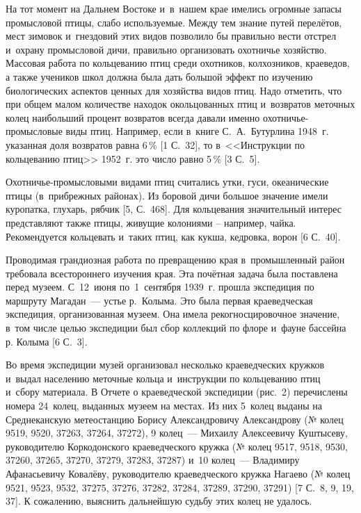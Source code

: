 На тот момент на Дальнем Востоке и~в~нашем крае имелись огромные запасы промысловой птицы, слабо используемые. Между тем знание путей перелётов, мест зимовок и~гнездовий этих видов позволило бы правильно вести отстрел и~охрану промысловой дичи, правильно организовать охотничье хозяйство. Массовая работа по кольцеванию птиц среди охотников, колхозников, краеведов, а также учеников школ должна была дать большой эффект по изучению биологических аспектов ценных для хозяйства видов птиц. Надо отметить, что при общем малом количестве находок окольцованных птиц и~возвратов меточных колец наибольший процент возвратов всегда давали именно охотничье-промысловые виды птиц. Например, если в~книге С.~А.~Бутурлина 1948~г. указанная доля возвратов равна 6\,\% [1 С.~32], то в~<<Инструкции по кольцеванию птиц>> 1952~г. это число равно 5\,\% [3 С.~5].

Охотничье-промысловыми видами птиц считались утки, гуси, океанические птицы (в~прибрежных районах). Из боровой дичи большое значение имели куропатка, глухарь, рябчик [5, С.~468]. Для кольцевания значительный интерес представляют также птицы, живущие колониями – например, чайка. Рекомендуется кольцевать и~таких птиц, как кукша, кедровка, ворон [6 С.~40].

Проводимая грандиозная работа по превращению края в~промышленный район требовала всестороннего изучения края. Эта почётная задача была поставлена перед музеем. С~12~июня по~1~сентября 1939~г. прошла экспедиция по маршруту Магадан~--- устье р.~Колыма. Это была первая краеведческая экспедиция, организованная музеем. Она имела рекогносцировочное значение, в~том числе целью экспедиции был сбор коллекций по флоре и~фауне бассейна р. Колыма [6 С.~3].

Во время экспедиции музей организовал несколько краеведческих кружков и~выдал населению меточные кольца и~инструкции по кольцеванию птиц и~сбору материала. В Отчете о краеведческой экспедиции (рис.~2) перечислены номера 24~колец, выданных музеем на местах. Из них 5~колец выданы на Среднеканскую метеостанцию Борису Александровичу Александрову (№ колец 9519, 9520, 37263, 37264, 37272), 9 колец~--- Михаилу Алексеевичу Куштысеву, руководителю Коркодонского краеведческого кружка (№ колец 9517, 9518, 9530, 37260, 37265, 37270, 37279, 37283, 37287) и~10 колец~--- Владимиру Афанасьевичу Ковалёву, руководителю краеведческого кружка Нагаево (№ колец 9521, 9523, 9532, 37275, 37276, 37282, 37284, 37289, 37290, 37291) [7 С.~8, 9, 19, 37]. К сожалению, выяснить дальнейшую судьбу этих колец не удалось.

